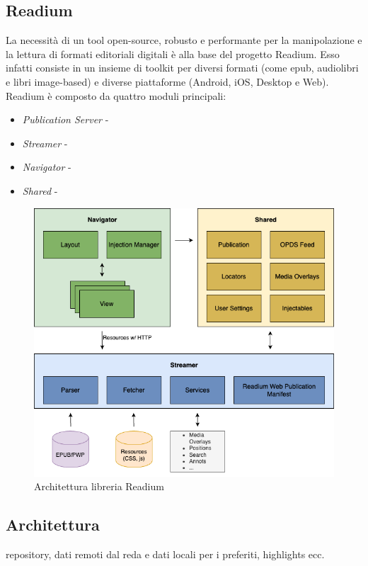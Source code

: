 \subsection{Readium}
La necessità di un tool open-source, robusto e performante per la manipolazione e la lettura di formati editoriali digitali è alla base del progetto Readium. Esso infatti consiste in un insieme di toolkit per diversi formati (come epub, audiolibri e libri image-based) e diverse piattaforme (Android, iOS, Desktop e Web).
Readium è composto da quattro moduli principali:
\begin{itemize}
    \item \textit{Publication Server} -
    \item \textit{Streamer} -
    \item \textit{Navigator} -
    \item \textit{Shared} -
\end{itemize}
\begin{figure}[H]
\centering
\includegraphics[width=1\textwidth]{img/tesi-22-readiumarch.drawio.png}
\caption{Architettura libreria Readium}
\end{figure}

\subsection{Architettura}
repository, dati remoti dal reda e dati locali per i preferiti, highlights ecc.

